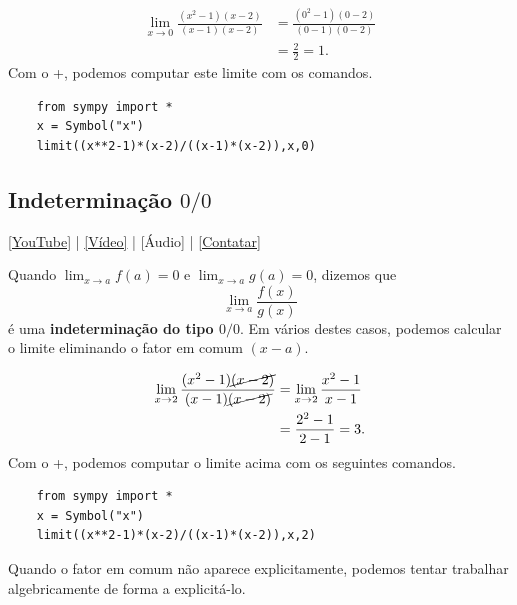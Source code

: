 \begin{ex}
  \begin{align}
    \lim_{x\to 0} \frac{(x^2-1)(x-2)}{(x-1)(x-2)} &= \frac{(0^2-1)(0-2)}{(0-1)(0-2)}\\
                                                  &= \frac{2}{2} = 1.
  \end{align}
  \ifispython
  Com o {\python}+{\sympy}, podemos computar este limite com os comandos.
  \begin{lstlisting}
    from sympy import *
    x = Symbol("x")
    limit((x**2-1)*(x-2)/((x-1)*(x-2)),x,0)
  \end{lstlisting}
  \fi
\end{ex}

\subsection{Indeterminação $0/0$}

\begin{flushright}
  \href{https://youtu.be/dW3CfM2JjKY}{[YouTube]} | \href{https://archive.org/details/video_20220701_1415}{[Vídeo]} | [Áudio] | \href{https://phkonzen.github.io/notas/contato.html}{[Contatar]}
\end{flushright}

Quando $\displaystyle \lim_{x\to a} f(a)=0$ e $\displaystyle \lim_{x\to a} g(a)=0$, dizemos que
\begin{equation}
  \lim_{x\to a} \frac{f(x)}{g(x)}
\end{equation}
é uma {\bf indeterminação do tipo $0/0$}. Em vários destes casos, podemos calcular o limite eliminando o fator em comum $(x-a)$.

\begin{ex}
  \begin{align}
    \lim_{x\to 2}\frac{(x^2-1)\cancel{(x-2)}}{(x-1)\cancel{(x-2)}} &= \lim_{x\to 2} \frac{x^2-1}{x-1}\\
                                                                   &= \frac{2^2-1}{2-1} = 3.
  \end{align}
  \ifispython
  Com o {\python}+{\sympy}, podemos computar o limite acima com os seguintes comandos.
  \begin{lstlisting}
    from sympy import *
    x = Symbol("x")
    limit((x**2-1)*(x-2)/((x-1)*(x-2)),x,2)
  \end{lstlisting}
  \fi
\end{ex}

Quando o fator em comum não aparece explicitamente, podemos tentar trabalhar algebricamente de forma a explicitá-lo.

